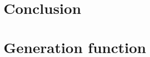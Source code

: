 \documentclass{ituthesis}
\theoremstyle{break}
\begin{document}




\chapter{Conclusion}
\label{cha:Conclusion}


\chapter{Generation function}
\label{cha:Generation function}

\end{document}
